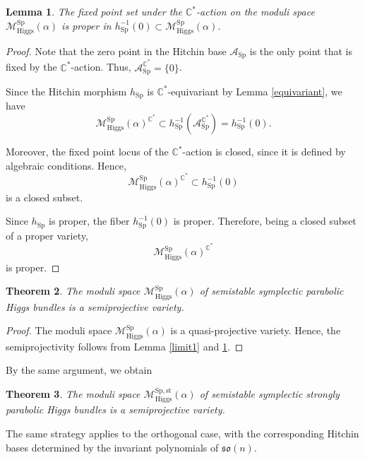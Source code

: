 \documentclass[11pt, reqno]{amsart}
\numberwithin{equation}{section}
\newtheorem{theorem}{Theorem}[section]
\newtheorem{lemma}[theorem]{Lemma}
\theoremstyle{definition}
\begin{document}
\begin{lemma}\label{fixed1}
The fixed point set under the $\mathbb{C}^*$-action on the moduli space $\mathcal{M}^{\mathrm{Sp}}_{\mathrm{Higgs}}(\alpha)$ is proper in $h_{\mathrm{Sp}}^{-1}(0) \subset \mathcal{M}^{\mathrm{Sp}}_{\mathrm{Higgs}}(\alpha)$.
\end{lemma}
\begin{proof}
Note that the zero point in the Hitchin base $\mathcal{A}_{\mathrm{Sp}}$ is the only point that is fixed by the $\mathbb{C}^*$-action. Thus, $\mathcal{A}_{\mathrm{Sp}}^{\mathbb{C}^*} = \{0\}$.

Since the Hitchin morphism $h_{\mathrm{Sp}}$ is $\mathbb{C}^*$-equivariant by Lemma \ref{equivariant}, we have
\[
\mathcal{M}^{\mathrm{Sp}}_{\mathrm{Higgs}}(\alpha)^{\mathbb{C}^*}
\subset h_{\mathrm{Sp}}^{-1}(\mathcal{A}_{\mathrm{Sp}}^{\mathbb{C}^*})
= h_{\mathrm{Sp}}^{-1}(0).
\]

Moreover, the fixed point locus of the $\mathbb{C}^*$-action is closed, since it is defined by algebraic conditions. Hence,
\[
\mathcal{M}^{\mathrm{Sp}}_{\mathrm{Higgs}}(\alpha)^{\mathbb{C}^*}
\subset h_{\mathrm{Sp}}^{-1}(0)
\]
is a closed subset.

Since $h_{\mathrm{Sp}}$ is proper, the fiber $h_{\mathrm{Sp}}^{-1}(0)$ is proper. Therefore, being a closed subset of a proper variety,
\[
\mathcal{M}^{\mathrm{Sp}}_{\mathrm{Higgs}}(\alpha)^{\mathbb{C}^*}
\]
is proper.
\end{proof}
\begin{theorem}\label{symplectic}
The moduli space $\mathcal{M}^{\mathrm{Sp}}_{\mathrm{Higgs}}(\alpha)$ of semistable symplectic parabolic Higgs bundles is a semiprojective variety.
\end{theorem}
\begin{proof}
The moduli space $\mathcal{M}^{\mathrm{Sp}}_{\mathrm{Higgs}}(\alpha)$ is a quasi-projective variety. Hence, the semiprojectivity follows from Lemma \ref{limit1} and \ref{fixed1}.
\end{proof}
By the same argument, we obtain
\begin{theorem}
    The moduli space $\mathcal{M}^{\mathrm{Sp},\mathrm{st}}_{\mathrm{Higgs}}(\alpha)$ of semistable symplectic strongly parabolic Higgs bundles is a semiprojective variety.
\end{theorem}

The same strategy applies to the orthogonal case, with the corresponding Hitchin bases determined by the invariant polynomials of $\mathfrak{so}(n)$.
\end{document}
